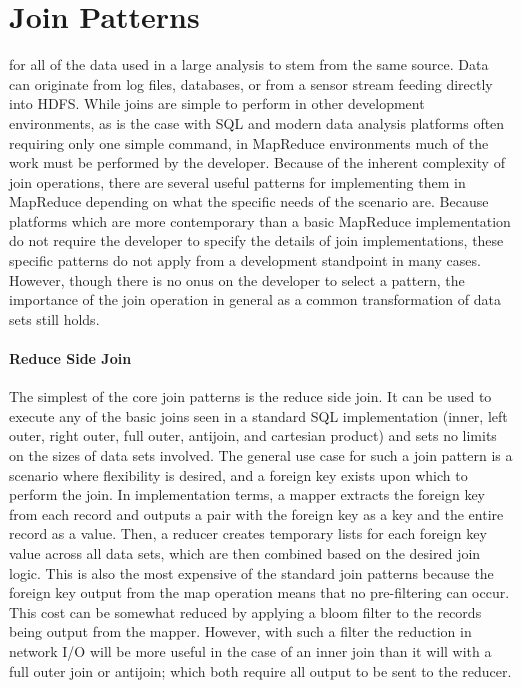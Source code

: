 \section{Join Patterns}
\label{sec:joins}
 for all of the data used in a large analysis to stem from the same source. Data can originate from log files, databases, or from a sensor stream feeding directly into HDFS. While joins are simple to perform in other development environments, as is the case with SQL and modern data analysis platforms often requiring only one simple command, in MapReduce environments much of the work must be performed by the developer. Because of the inherent complexity of join operations, there are several useful patterns for implementing them in MapReduce depending on what the specific needs of the scenario are. Because platforms which are more contemporary than a basic MapReduce implementation do not require the developer to specify the details of join implementations, these specific patterns do not apply from a development standpoint in many cases. However, though there is no onus on the developer to select a pattern, the importance of the join operation in general as a common transformation of data sets still holds.

\paragraph{Reduce Side Join}
The simplest of the core join patterns is the reduce side join. It can be used to execute any of the basic joins seen in a standard SQL implementation (inner, left outer, right outer, full outer, antijoin, and cartesian product) and sets no limits on the sizes of data sets involved. The general use case for such a join pattern is a scenario where flexibility is desired, and a foreign key exists upon which to perform the join. In implementation terms, a mapper extracts the foreign key from each record and outputs a pair with the foreign key as a key and the entire record as a value. Then, a reducer creates temporary lists for each foreign key value across all data sets, which are then combined based on the desired join logic. This is also the most expensive of the standard join patterns because the foreign key output from the map operation means that no pre-filtering can occur. This cost can be somewhat reduced by applying a bloom filter to the records being output from the mapper. However, with such a filter the reduction in network I/O will be more useful in the case of an inner join than it will with a full outer join or antijoin; which both require all output to be sent to the reducer. 


